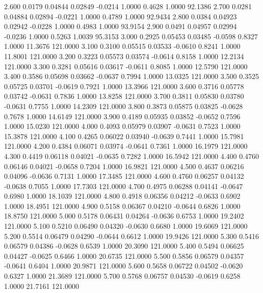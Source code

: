    2.600   0.0179   0.04844   0.02849  -0.0214   1.0000   0.4628   1.0000  92.1386
   2.700   0.0281   0.04884   0.02894  -0.0221   1.0000   0.4789   1.0000  92.9434
   2.800   0.0384   0.04923   0.02942  -0.0228   1.0000   0.4983   1.0000  93.9154
   2.900   0.0491   0.04957   0.02994  -0.0236   1.0000   0.5263   1.0039  95.3153
   3.000   0.2925   0.05453   0.03485  -0.0598   0.8327   1.0000  11.3676 121.0000
   3.100   0.3100   0.05515   0.03533  -0.0610   0.8241   1.0000  11.8001 121.0000
   3.200   0.3223   0.05573   0.03574  -0.0614   0.8158   1.0000  12.2134 121.0000
   3.300   0.3281   0.05616   0.03617  -0.0611   0.8085   1.0000  12.5790 121.0000
   3.400   0.3586   0.05698   0.03662  -0.0637   0.7994   1.0000  13.0325 121.0000
   3.500   0.3525   0.05725   0.03701  -0.0619   0.7921   1.0000  13.3966 121.0000
   3.600   0.3716   0.05778   0.03742  -0.0631   0.7836   1.0000  13.8258 121.0000
   3.700   0.3811   0.05830   0.03780  -0.0631   0.7755   1.0000  14.2309 121.0000
   3.800   0.3873   0.05875   0.03825  -0.0628   0.7678   1.0000  14.6149 121.0000
   3.900   0.4189   0.05935   0.03852  -0.0652   0.7596   1.0000  15.0230 121.0000
   4.000   0.4093   0.05979   0.03907  -0.0631   0.7523   1.0000  15.3878 121.0000
   4.100   0.4265   0.06022   0.03940  -0.0639   0.7441   1.0000  15.7981 121.0000
   4.200   0.4384   0.06071   0.03974  -0.0641   0.7361   1.0000  16.1979 121.0000
   4.300   0.4419   0.06118   0.04021  -0.0635   0.7282   1.0000  16.5942 121.0000
   4.400   0.4760   0.06146   0.04021  -0.0658   0.7204   1.0000  16.9821 121.0000
   4.500   0.4637   0.06216   0.04096  -0.0636   0.7131   1.0000  17.3485 121.0000
   4.600   0.4760   0.06257   0.04132  -0.0638   0.7055   1.0000  17.7303 121.0000
   4.700   0.4975   0.06288   0.04141  -0.0647   0.6980   1.0000  18.1039 121.0000
   4.800   0.4918   0.06356   0.04212  -0.0633   0.6902   1.0000  18.4951 121.0000
   4.900   0.5158   0.06367   0.04210  -0.0644   0.6826   1.0000  18.8750 121.0000
   5.000   0.5178   0.06431   0.04264  -0.0636   0.6753   1.0000  19.2402 121.0000
   5.100   0.5210   0.06490   0.04320  -0.0630   0.6680   1.0000  19.6069 121.0000
   5.200   0.5514   0.06479   0.04290  -0.0644   0.6612   1.0000  19.9426 121.0000
   5.300   0.5416   0.06579   0.04386  -0.0628   0.6539   1.0000  20.3090 121.0000
   5.400   0.5494   0.06625   0.04427  -0.0625   0.6466   1.0000  20.6735 121.0000
   5.500   0.5856   0.06579   0.04357  -0.0641   0.6404   1.0000  20.9871 121.0000
   5.600   0.5658   0.06722   0.04502  -0.0620   0.6327   1.0000  21.3689 121.0000
   5.700   0.5768   0.06757   0.04530  -0.0619   0.6258   1.0000  21.7161 121.0000
